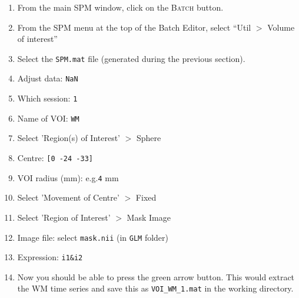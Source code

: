 \begin{enumerate}
 \item From the main SPM window, click on the \textsc{Batch} button.
 \item From the SPM menu at the top of the Batch Editor, select ``Util $>$ Volume of interest''
 \item Select the \texttt{SPM.mat} file (generated during the previous section).
 \item Adjust data: \texttt{NaN}
 \item Which session: \texttt{1}
 \item Name of VOI: \texttt{WM}
 \item Select 'Region(s) of Interest' $>$ Sphere
 \item Centre: \texttt{[0 -24 -33]}
 \item VOI radius (mm): e.g.\texttt{4} mm
 \item Select 'Movement of Centre' $>$ Fixed
 \item Select 'Region of Interest' $>$ Mask Image
 \item Image file: select \texttt{mask.nii} (in \texttt{GLM} folder)
 \item Expression: \texttt{i1\&i2}
 \item Now you should be able to press the green arrow button. This would extract the WM time series and save this as  \texttt{VOI\_WM\_1.mat} in the working directory.
\end{enumerate}

